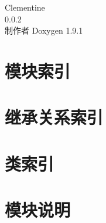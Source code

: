 \let\mypdfximage\pdfximage\def\pdfximage{\immediate\mypdfximage}\documentclass[twoside]{book}
\newcommand{\+}{\discretionary{\mbox{\scriptsize$\hookleftarrow$}}{}{}}
\newcommand{\clearemptydoublepage}{%
  \newpage{\pagestyle{empty}\cleardoublepage}%
}
\begin{document}
\raggedbottom
\begin{CJK}{UTF8}{min}

\hypersetup{pageanchor=false,
             bookmarksnumbered=true,
             pdfencoding=unicode
            }
\begin{titlepage}
\vspace*{7cm}
\begin{center}%
{\Large Clementine \\[1ex]\large 0.\+0.\+2 }\\
\vspace*{1cm}
{\large 制作者 Doxygen 1.9.1}\\
\end{center}
\end{titlepage}
\clearemptydoublepage
{}
\tableofcontents
\clearemptydoublepage
{}
\hypersetup{pageanchor=true}

\chapter{模块索引}

\chapter{继承关系索引}

\chapter{类索引}

\chapter{模块说明}







\end{CJK}
\end{document}
